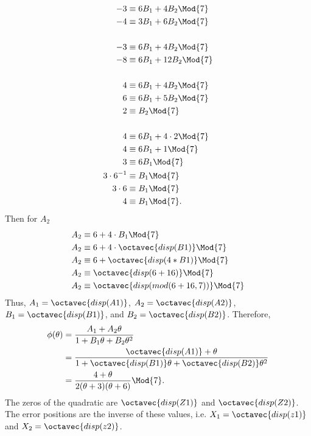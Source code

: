 \begin{align*}
	-3 &\equiv 6B_1 + 4B_2 \Mod{7}\\
	-4 &\equiv 3B_1 + 6B_2 \Mod{7}\\\\
	-3 &\equiv 6B_1 + 4B_2 \Mod{7}\\	
	-8 &\equiv 6B_1 +12B_2 \Mod{7}\\\\
	 4 &\equiv 6B_1 + 4B_2 \Mod{7}\\
	 6 &\equiv 6B_1 + 5B_2 \Mod{7}\\
	 2 &\equiv B_2 \Mod{7}\\\\
	 4 &\equiv 6B_1 + 4\cdot 2 \Mod{7}\\
	 4 &\equiv 6B_1 + 1 \Mod{7}\\
	 3 &\equiv 6B_1 \Mod{7}\\
	 3\cdot6^{-1} &\equiv B_1 \Mod{7}\\
	 3\cdot6 &\equiv B_1 \Mod{7}\\
	 4 &\equiv B_1 \Mod{7}.
\end{align*}
Then for $A_2$
\begin{align*}
	A_2 &\equiv 6 + 4\cdot B_1 \Mod{7}\\
	A_2 &\equiv 6 + 4\cdot \octavec{disp(B1)} \Mod{7}\\
	A_2 &\equiv 6 + \octavec{disp(4 * B1)} \Mod{7}\\
	A_2 &\equiv \octavec{disp(6 + 16)} \Mod{7}\\
	A_2 &\equiv \octavec{disp(mod(6 + 16,7))} \Mod{7}\\
\end{align*}
Thus, $A_1=\octavec{disp(A1)}$, $A_2=\octavec{disp(A2)}$, $B_1=\octavec{disp(B1)}$, and $B_2=\octavec{disp(B2)}$. Therefore,
\begin{align*}
	\phi(\theta) &= \frac{A_1 + A_2\theta}{1 + B_1\theta + B_2\theta^2}\\
	 &= \frac{ \octavec{disp(A1)} + \theta}{1 + \octavec{disp(B1)}\theta + \octavec{disp(B2)}\theta^2}\\
	&= \frac{4 + \theta}{2(\theta+3)(\theta + 6)}\Mod{7}.
\end{align*}
The zeros of the quadratic are $\octavec{disp(Z1)}$ and $\octavec{disp(Z2)}$. The error positions are the inverse of these values, i.e. $X_1=\octavec{disp(z1)}$ and $X_2=\octavec{disp(z2)}$.

